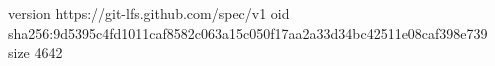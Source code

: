 version https://git-lfs.github.com/spec/v1
oid sha256:9d5395c4fd1011caf8582c063a15c050f17aa2a33d34bc42511e08caf398e739
size 4642
